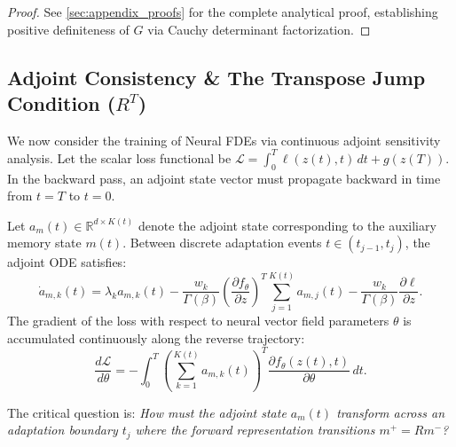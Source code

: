 \documentclass[11pt,a4paper]{article}
\theoremstyle{plain}
\theoremstyle{definition}
\newcommand{\R}{\mathbb{R}}
\begin{document}
\begin{proof}
See \cref{sec:appendix_proofs} for the complete analytical proof, establishing positive definiteness of $G$ via Cauchy determinant factorization.
\end{proof}

\subsection{Adjoint Consistency \& The Transpose Jump Condition ($R^T$)}
\label{subsec:adjoint_jump_theorem}

We now consider the training of Neural FDEs via continuous adjoint sensitivity analysis. Let the scalar loss functional be $\mathcal{L} = \int_0^T \ell(z(t), t) \, dt + g(z(T))$. In the backward pass, an adjoint state vector must propagate backward in time from $t = T$ to $t = 0$.

Let $a_m(t) \in \R^{d \times K(t)}$ denote the adjoint state corresponding to the auxiliary memory state $m(t)$. Between discrete adaptation events $t \in (t_{j-1}, t_j)$, the adjoint ODE satisfies:
\begin{equation}
    \dot{a}_{m, k}(t) = \lambda_k a_{m, k}(t) - \frac{w_k}{\Gamma(\beta)} \left( \frac{\partial f_\theta}{\partial z} \right)^T \sum_{j=1}^{K(t)} a_{m, j}(t) - \frac{w_k}{\Gamma(\beta)} \frac{\partial \ell}{\partial z}.
    \label{eq:adjoint_ode}
\end{equation}
The gradient of the loss with respect to neural vector field parameters $\theta$ is accumulated continuously along the reverse trajectory:
\begin{equation}
    \frac{d\mathcal{L}}{d\theta} = -\int_0^T \left( \sum_{k=1}^{K(t)} a_{m, k}(t) \right)^T \frac{\partial f_\theta(z(t), t)}{\partial \theta} \, dt.
    \label{eq:adjoint_param_grad}
\end{equation}

The critical question is: \emph{How must the adjoint state $a_m(t)$ transform across an adaptation boundary $t_j$ where the forward representation transitions $m^+ = R m^-$?}
\end{document}
